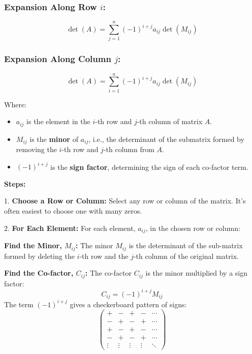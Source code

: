 \subsubsection*{Expansion Along Row \(i\):}

\[
\det(A) = \sum_{j=1}^{n} {(-1)}^{i+j} a_{ij} \det(M_{ij})
\]

\subsubsection*{Expansion Along Column \(j\):}

\[
\det(A) = \sum_{i=1}^{n} {(-1)}^{i+j} a_{ij} \det(M_{ij})
\]

Where:

\begin{itemize}
    \item \( a_{ij} \) is the element in the \(i\)-th row and \(j\)-th column of matrix \(A\).
    \item \( M_{ij} \) is the \textbf{minor} of \( a_{ij} \), i.e., the determinant of the submatrix formed by removing the \(i\)-th row and \(j\)-th column from \(A\).
    \item \( {(-1)}^{i+j} \) is the \textbf{sign factor}, determining the sign of each co-factor term.
\end{itemize}

\textbf{Steps:}

1.\textbf{ Choose a Row or Column:} Select any row or column of the matrix.  It's often easiest to choose one with many zeros.

 2.\textbf{ For Each Element:} For each element, \(a_{ij}\), in the chosen row or column:

    \textbf{Find the Minor, \(M_{ij}\):} The minor \(M_{ij}\) is the determinant of the sub-matrix formed by deleting the 
    \indent \(i\)-th row and the \(j\)-th column of the original matrix.

    \textbf{Find the Co-factor, \(C_{ij}\):} The co-factor \(C_{ij}\) is the minor multiplied by a sign factor:
        \[
        C_{ij} = {(-1)}^{i+j} M_{ij}
        \]
        The term  \({(-1)}^{i+j}\)  gives a checkerboard pattern of signs:
        \[
        \begin{pmatrix}
        + & - & + & - & \cdots \\
        - & + & - & + & \cdots \\
        + & - & + & - & \cdots \\
        - & + & - & + & \cdots \\
        \vdots & \vdots & \vdots & \vdots & \ddots
        \end{pmatrix}
        \]

